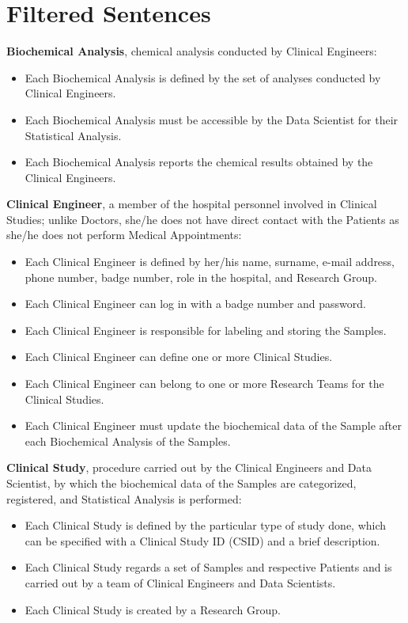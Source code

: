 \section{Filtered Sentences}
\textbf{Biochemical Analysis}, chemical analysis conducted by Clinical Engineers:
\begin{itemize}
    \item Each Biochemical Analysis is defined by the set of analyses conducted by Clinical Engineers.
    \item Each Biochemical Analysis must be accessible by the Data Scientist for their Statistical Analysis.
    \item Each Biochemical Analysis reports the chemical results obtained by the Clinical Engineers.
\end{itemize}
\textbf{Clinical Engineer}, a member of the hospital personnel involved in Clinical Studies; unlike Doctors, she/he does not have direct contact with the Patients as she/he does not perform Medical Appointments:
\begin{itemize}
    \item Each Clinical Engineer is defined by her/his name, surname, e-mail address, phone number, badge number, role in the hospital, and Research Group.
    \item Each Clinical Engineer can log in with a badge number and password.
    \item Each Clinical Engineer is responsible for labeling and storing the Samples.
    \item Each Clinical Engineer can define one or more Clinical Studies.
    \item Each Clinical Engineer can belong to one or more Research Teams for the Clinical Studies.
    \item Each Clinical Engineer must update the biochemical data of the Sample after each Biochemical Analysis of the Samples.
\end{itemize}
\textbf{Clinical Study}, procedure carried out by the Clinical Engineers and Data Scientist, by which the biochemical data of the Samples are categorized, registered, and Statistical Analysis is performed:
\begin{itemize}
    \item Each Clinical Study is defined by the particular type of study done, which can be specified with a Clinical Study ID (CSID) and a brief description.
    \item Each Clinical Study regards a set of Samples and respective Patients and is carried out by a team of Clinical Engineers and Data Scientists.
    \item Each Clinical Study is created by a Research Group.
\end{itemize}
